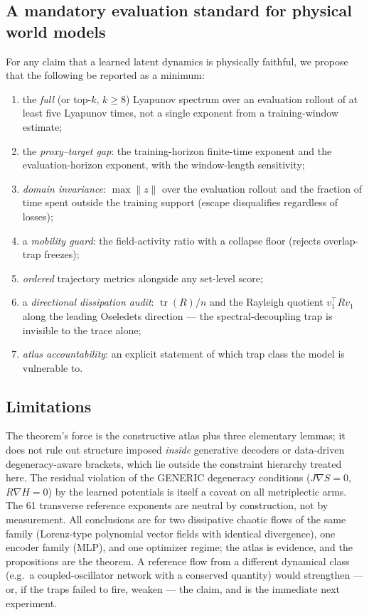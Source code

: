 \documentclass[journal]{IEEEtran}
\newcommand{\tr}{\operatorname{tr}}
\newcommand{\grad}{\nabla}
\begin{document}
\subsection{A mandatory evaluation standard for physical world models}
\label{sec:standard}
For any claim that a learned latent dynamics is physically faithful, we
propose that the following be reported as a minimum:
\begin{enumerate}
\item the \emph{full} (or top-$k$, $k\ge 8$) Lyapunov spectrum over an
evaluation rollout of at least five Lyapunov times, not a single exponent
from a training-window estimate;
\item the \emph{proxy--target gap}: the training-horizon finite-time
exponent and the evaluation-horizon exponent, with the window-length
sensitivity;
\item \emph{domain invariance}: $\max\|z\|$ over the evaluation rollout
and the fraction of time spent outside the training support (escape
disqualifies regardless of losses);
\item a \emph{mobility guard}: the field-activity ratio with a collapse
floor (rejects overlap-trap freezes);
\item \emph{ordered} trajectory metrics alongside any set-level score;
\item a \emph{directional dissipation audit}: $\tr(R)/n$ and the Rayleigh
quotient $v_1^\top R v_1$ along the leading Oseledets direction --- the
spectral-decoupling trap is invisible to the trace alone;
\item \emph{atlas accountability}: an explicit statement of which trap
class the model is vulnerable to.
\end{enumerate}

\subsection{Limitations}
The theorem's force is the constructive atlas plus three elementary
lemmas; it does not rule out structure imposed \emph{inside} generative
decoders or data-driven degeneracy-aware brackets, which lie outside the
constraint hierarchy treated here. The residual violation of the GENERIC
degeneracy conditions ($J\grad S=0$, $R\grad H=0$) by the learned
potentials is itself a caveat on all metriplectic arms. The 61 transverse
reference exponents are neutral by construction, not by measurement.
All conclusions are for two dissipative chaotic flows of the same
family (Lorenz-type polynomial vector fields with identical divergence),
one encoder family (MLP), and one optimizer regime; the atlas is
evidence, and the propositions are the theorem. A reference flow from a
different dynamical class (e.g.\ a coupled-oscillator network with a
conserved quantity) would strengthen --- or, if the traps failed to
fire, weaken --- the claim, and is the immediate next experiment.
\end{document}

